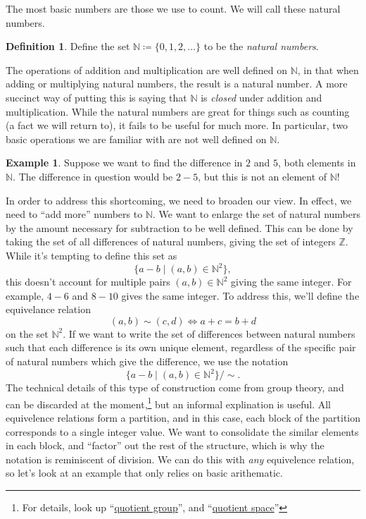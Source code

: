 \documentclass{article}
\newcommand{\N}{\mathbb{N}}
\newcommand{\Z}{\mathbb{Z}}
\theoremstyle{definition}
\newtheorem{definition}{Definition}[section]
\newtheorem{example}{Example}[section]
\begin{document}
	The most basic numbers are those we use to count. We will call these natural numbers. 
	\begin{definition}\label{def1.1}
		Define the set $ \N\coloneqq\{0,1,2,\ldots\} $ to be the \textit{{\color{red} natural numbers}}. 
	\end{definition}
	The operations of addition and multiplication are well defined on $ \N $, in that when adding or multiplying natural numbers, the result is a natural number. A more succinct way of putting this is saying that $ \N $ is \textit{closed} under addition and multiplication. While the natural numbers are great for things such as counting (a fact we will return to), it fails to be useful for much more. In particular, two basic operations we are familiar with are not well defined on $ \N $.
	\begin{example}
		Suppose we want to find the difference in $ 2 $ and $ 5 $, both elements in $ \N $. The difference in question would be $ 2-5 $, but this is not an element of $ \N $! 
	\end{example}
	
	In order to address this shortcoming, we need to broaden our view. In effect, we need to ``add more'' numbers to $ \N $. We want to enlarge the set of natural numbers by the amount necessary for subtraction to be well defined. This can be done by taking the set of all differences of natural numbers, giving the set of integers $\Z$. While it's tempting to define this set as $$\{a-b\mid(a,b)\in\N^2\},$$ this doesn't account for multiple pairs $(a,b)\in \N^2$ giving the same integer. For example, $4 - 6$ and $8-10$ gives the same integer. To address this, we'll define the equivelance relation $$ (a,b)\sim(c,d) \iff  a+c=b+d $$ on the set $\N^2$. If we want to write the set of differences between natural numbers such that each difference is its own unique element, regardless of the specific pair of natural numbers which give the difference, we use the notation 
	$$ \{a-b\mid(a,b)\in\N^2\}/\sim. $$
	The technical details of this type of construction come from group theory, and can be discarded at the moment,\footnote{For details, look up ``\href{https://www.math3ma.com/blog/whats-a-quotient-group-really-part-1}{quotient group}'', and ``\href{https://www3.nd.edu/~jdiller/teaching/archive/spring12_20820/quotient-spaces.pdf}{quotient space}''} but an informal explination is useful. All equivelence relations form a partition, and in this case, each block of the partition corresponds to a single integer value. We want to consolidate the similar elements in each block, and ``factor'' out the rest of the structure, which is why the notation is reminiscent of division. We can do this with \textit{any} equivelence relation, so let's look at an example that only relies on basic arithematic. 
	
\end{document}
